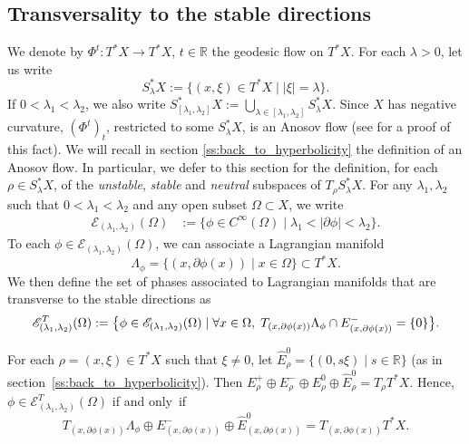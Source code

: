 \documentclass[10pt]{amsart}
\let\mathcal\mathscr
\let\sep\mid
\theoremstyle{plain}
\theoremstyle{definition}
\newcommand{\R}{\mathbb{R}}
\def\calE{\mathcal{E}}
\begin{document}
\subsection{Transversality to the stable directions}\label{ss:Hyp}

We denote by $\Phi^t:T^*X\to T^*X$, $t\in\R$ the geodesic flow on $T^*X$. For each $\lambda > 0$, let us write
\[
S_\lambda^*X := \{ (x,\xi)\in T^*X \sep |\xi| = \lambda\}.
\]
If $0<\lambda_1<\lambda_2$, we also write $S^*_{[\lambda_1,\lambda_2]}X := \bigcup_{\lambda \in [\lambda_1, \lambda_2]} S_\lambda^*X$. Since $X$ has negative curvature, $(\Phi^t)_t$, restricted to some $S_\lambda^*X$, is an Anosov flow (see \cite{Ebe} for a proof of this fact). We will recall in section \ref{ss:back_to_hyperbolicity} the definition of an Anosov flow. In particular, we defer to this section for the definition, for each $\rho\in S_\lambda^*X$, of the \emph{unstable}, \emph{stable} and \emph{neutral} subspaces of $T_\rho S_\lambda^*X$. For any $\lambda_1,\lambda_2$ such that $0<\lambda_1<\lambda_2$ and any open subset $\Omega\subset X$, we write
\begin{equation}\label{eq:SpacePhases}
\begin{aligned}
\mathcal{E}_{(\lambda_1,\lambda_2)}(\Omega)&:= \{ \phi\in C^\infty(\Omega) \sep \lambda_1< |\partial \phi | < \lambda_2 \}.
\end{aligned}
\end{equation}
To each $\phi\in \mathcal{E}_{(\lambda_1,\lambda_2)}(\Omega)$, we can associate a Lagrangian manifold
\[
\Lambda_\phi=\{(x,\partial\phi(x))\sep x\in\Omega\}\subset T^*X.
\]
We then define the set of phases associated to Lagrangian manifolds that are transverse to the stable directions as
\begin{equation}\label{eq:TransversePhases}
\mathcal{E}^{T}_{(\lambda_1,\lambda_2)}(\Omega) :=\big{\{} \phi \in \mathcal{E}_{(\lambda_1,\lambda_2)}(\Omega) \sep\forall x\in \Omega,\; T_{(x,\partial \phi(x))} \Lambda_\phi \cap E^-_{(x,\partial \phi(x))} = \{0\} \big{\}}.
\end{equation}

For each $\rho=(x,\xi)\in T^*X$ such that $\xi\neq 0$, let $\hat{E}^0_\rho=\{(0,s\xi)\sep s\in\R\}$ (as in sec\-tion~\ref{ss:back_to_hyperbolicity}). Then $E^+_\rho\oplus E^-_\rho\oplus E^0_\rho \oplus \hat{E}^0_\rho= T_\rho T^*X$. Hence, $\phi\in\calE^T_{(\lambda_1,\lambda_2)}(\Omega)$ if and only~if
\[
T_{(x,\partial\phi(x))}\Lambda_\phi\oplus E^-_{(x,\partial\phi(x))}\oplus \hat{E}^0_{(x,\partial\phi(x))}=T_{(x,\partial\phi(x))}T^*X.
\]
\end{document}
